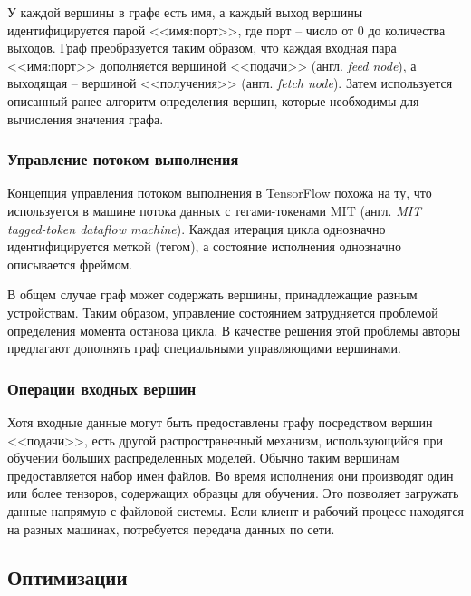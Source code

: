 У каждой вершины в графе есть имя, а каждый выход вершины идентифицируется парой
<<имя:порт>>, где порт -- число от 0 до количества выходов. Граф преобразуется
таким образом, что каждая входная пара <<имя:порт>> дополняется вершиной
<<подачи>> (англ. \textit{feed node}), а выходящая -- вершиной <<получения>>
(англ. \textit{fetch node}). Затем используется описанный ранее алгоритм
определения вершин, которые необходимы для вычисления значения графа.


\subsubsection{Управление потоком выполнения}

Концепция управления потоком выполнения в TensorFlow похожа на ту, что
используется в машине потока данных с тегами-токенами MIT (англ.
\textit{MIT tagged-token dataflow machine})\cite{mit_tagged_token}.
Каждая итерация цикла однозначно идентифицируется меткой (тегом), а состояние
исполнения однозначно описывается фреймом.

В общем случае граф может содержать вершины, принадлежащие разным устройствам.
Таким образом, управление состоянием затрудняется проблемой определения момента
останова цикла. В качестве решения этой проблемы авторы предлагают дополнять
граф специальными управляющими вершинами.

\subsubsection{Операции входных вершин}

Хотя входные данные могут быть предоставлены графу посредством вершин <<подачи>>,
есть другой распространенный механизм, использующийся при обучении больших
распределенных моделей. Обычно таким вершинам предоставляется набор имен файлов.
Во время исполнения они производят один или более тензоров, содержащих образцы
для обучения. Это позволяет загружать данные напрямую с файловой системы. Если
клиент и рабочий процесс находятся на разных машинах, потребуется передача
данных по сети.

\subsection{Оптимизации}

